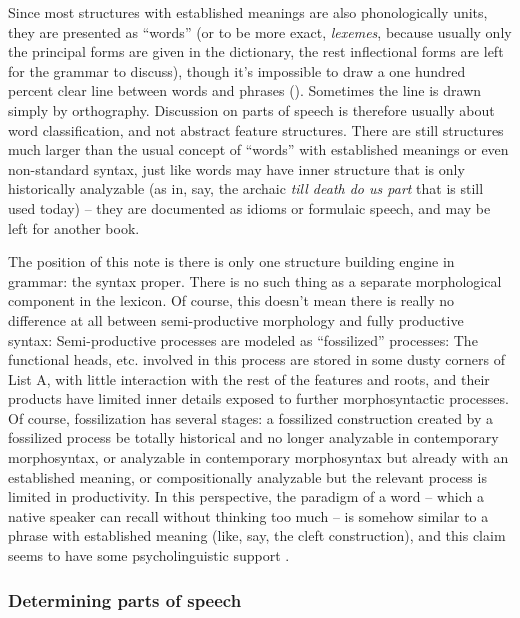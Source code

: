 \documentclass[UTF8, a4paper, oneside, scheme=plain]{ctexrep}
\newcommand*{\citepages}[1]{pp.~{#1}}
\newcommand*{\term}[1]{\emph{#1}}
\newcommand{\corpus}[1]{\emph{#1}}
\begin{document}
Since most structures with established meanings 
are also phonologically units,
they are presented as ``words''
(or to be more exact, \term{lexemes}, 
because usually only the principal forms are given in the dictionary,
the rest inflectional forms are left for the grammar to discuss),
though it's impossible to draw a one hundred percent clear line 
between words and phrases ().
Sometimes the line is drawn simply by orthography.
Discussion on parts of speech is therefore usually about word classification,
and not abstract feature structures.
There are still structures much larger than the usual concept of ``words'' 
with established meanings or even non-standard syntax,
just like words may have inner structure that is only historically analyzable
(as in, say, the archaic \corpus{till death do us part} that is still used today) -- 
they are documented as idioms or formulaic speech,
and may be left for another book.

The position of this note is there is only one structure building engine in grammar:
the syntax proper.
There is no such thing as a separate morphological component in the lexicon.
Of course, this doesn't mean there is really no difference at all 
between semi-productive morphology and 
fully productive syntax:
Semi-productive processes 
are modeled as ``fossilized'' processes:
The functional heads, etc. involved in this process 
are stored in some dusty corners of List A,
with little interaction with the rest of the features and roots,
and their products have limited inner details exposed to further morphosyntactic processes.
Of course, fossilization has several stages:
a fossilized construction created by a fossilized process 
be totally historical and no longer analyzable in contemporary morphosyntax,
or analyzable in contemporary morphosyntax but already with an established meaning,
or compositionally analyzable but the relevant process is limited in productivity.
In this perspective, 
the paradigm of a word -- which a native speaker can recall without thinking too much -- 
is somehow similar to a phrase with established meaning (like, say, the cleft construction),
and this claim seems to have some psycholinguistic support
\citep[\citepages{polinsky2018}]{polinsky2018}.

\subsubsection{Determining parts of speech}\label{sec:pos}
\end{document}
